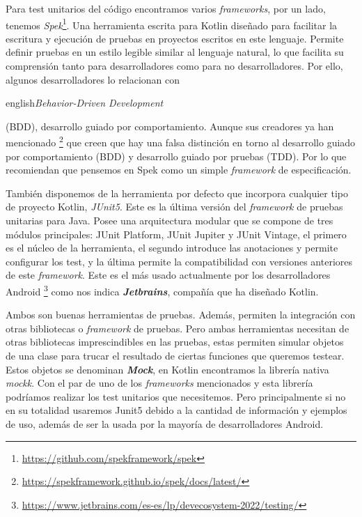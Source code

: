 Para test unitarios del código encontramos varios \textit{frameworks}, por un lado, tenemos 
\textit{Spek}\footnote{\url{https://github.com/spekframework/spek}}. Una herramienta escrita para 
Kotlin diseñado para facilitar la escritura y ejecución de pruebas en proyectos escritos en este 
lenguaje. Permite definir pruebas en un estilo legible similar al lenguaje natural, lo que facilita 
su comprensión tanto para desarrolladores como para no desarrolladores. Por ello, algunos 
desarrolladores lo relacionan con \begin{otherlanguage}
{english}\textit{Behavior-Driven Development}\end{otherlanguage} (BDD), desarrollo guiado por 
comportamiento. Aunque sus creadores ya han mencionado 
\footnote{\url{https://spekframework.github.io/spek/docs/latest/}} que creen que hay una falsa 
distinción en torno al desarrollo guiado por comportamiento (BDD) y desarrollo guiado por pruebas 
(TDD). Por lo que recomiendan que pensemos en Spek como un simple \textit{framework} de 
especificación.

También disponemos de la herramienta por defecto que incorpora cualquier tipo de proyecto Kotlin, 
\textit{JUnit5}. Este es la última versión del \textit{framework} de pruebas unitarias para Java. Posee 
una arquitectura modular que se compone de tres módulos principales: JUnit Platform, JUnit Jupiter y 
JUnit Vintage, el primero es el núcleo de la herramienta, el segundo introduce las anotaciones y 
permite configurar los test, y la última permite la compatibilidad con versiones anteriores de este 
\textit{framework}. Este es el más usado actualmente por los desarrolladores Android 
\footnote{\url{https://www.jetbrains.com/es-es/lp/devecosystem-2022/testing/}} como nos indica 
\textbf{\textit{Jetbrains}}, compañía que ha diseñado Kotlin.

Ambos son buenas herramientas de pruebas. Además, permiten la integración con otras bibliotecas o 
\textit{framework} de pruebas. Pero ambas herramientas necesitan de otras bibliotecas imprescindibles 
en las pruebas, estas permiten simular objetos de una clase para trucar el resultado de ciertas 
funciones que queremos testear. Estos objetos se denominan \textbf{\textit{Mock}}, en Kotlin 
encontramos la librería nativa \textit{mockk}. Con el par de uno de los \textit{frameworks} mencionados 
y esta librería podríamos realizar los test unitarios que necesitemos. Pero principalmente si no en su 
totalidad usaremos Junit5 debido a la cantidad de información y ejemplos de uso, además de ser la usada 
por la mayoría de desarrolladores Android.

